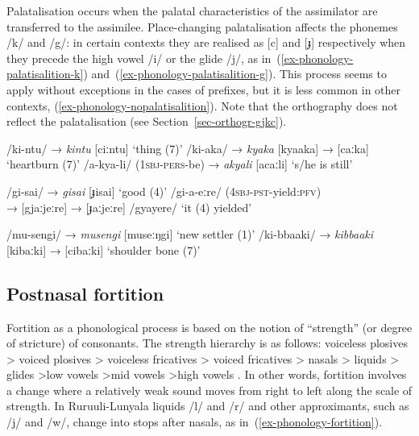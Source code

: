 Palatalisation occurs when the palatal characteristics of the assimilator are transferred to the assimilee.  
Place-changing palatalisation affects the phonemes /k/ and /g/: in certain contexts they are realised as [c] and [ɟ] respectively when they precede the high vowel /i/ or the glide /j/, as in~(\ref{ex-phonology-palatisalition-k}) and~(\ref{ex-phonology-palatisalition-g}). 
This process seems to apply without exceptions in the cases of prefixes, but it is less common in other contexts, \cf (\ref{ex-phonology-nopalatisalition}). 
Note that the orthography does not reflect the palatalisation (see Section~\ref{sec-orthogr-gjkc}). 

\ea \label{ex-phonology-palatisalition-k}
\begin{xlist}	
	\ex 	/ki-ntu/ →  \textit{kintu} [ciːntu] `thing (7)'
	\ex 	/ki-aka/ →   \textit{kyaka} [kyaaka] → [caːka] `heartburn (7)' 
	\ex 	/a-kya-li/ (\textsc{1sbj}-\textsc{pers}-be) →  \textit{akyali} [acaːli] `s/he is still'
\end{xlist}	
\z

\ea \label{ex-phonology-palatisalition-g}
\begin{xlist}	
	\ex 	/gi-sai/ →  \textit{gisai} [ɟisai] `good (4)'
	\ex 	/gi-a-eːre/ (\textsc{4sbj}-\textsc{pst}-yield:\textsc{pfv})\\→ [gjaːjeːre] →  [ɟaːjeːre] /gyayere/ `it (4) yielded' 
\end{xlist}	
\z

\ea \label{ex-phonology-nopalatisalition}
\begin{xlist}	
	\ex 	/mu-sengi/ →  \textit{musengi} [museːŋgi] ‘new settler (1)’
	\ex 	/ki-bbaaki/ →   \textit{kibbaaki} [kibaːki] → [cibaːki] `shoulder bone (7)'
\end{xlist}	
\z


\subsection{Postnasal fortition}\label{sec-phonology-fortition}

Fortition as a phonological process is based on the notion of “strength” (or degree of stricture) of consonants.
The strength hierarchy is as follows: voiceless plosives > voiced plosives > voiceless fricatives > voiced fricatives > nasals > liquids > glides >low vowels >mid vowels >high vowels \citep{Vennemann1988Preference}. 
In other words, fortition involves a change where a relatively weak sound moves from right to left along the scale of strength. 
In Ru\-ruu\-li\hyp{}Lu\-nya\-la liquids /l/ and /r/ and other approximants, such as /j/ and /w/, change into stops after nasals, as in~(\ref{ex-phonology-fortition}).


